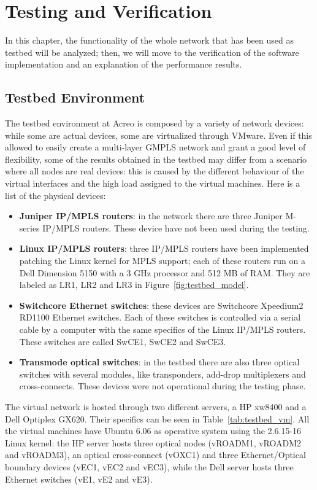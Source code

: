 \documentclass[10pt,a4paper]{report}
\begin{document}
\chapter{Testing and Verification}\label{sec:test}
 
In this chapter, the functionality of the whole network that has been
used as testbed will be analyzed; then, we will move to the
verification of the software implementation and an explanation of the
performance results.
 
\section{Testbed Environment}
 
The testbed environment at Acreo is composed by a variety of network
devices: while some are actual devices, some are virtualized through
VMware. Even if this allowed to easily create a multi-layer GMPLS
network and grant a good level of flexibility, some of the results
obtained in the testbed may differ from a scenario where all nodes are
real devices: this is caused by the different behaviour of the virtual
interfaces and the high load assigned to the virtual machines. Here is
a list of the physical devices:
\begin{itemize}
\item \textbf{Juniper IP/MPLS routers}: in the network there are three
  Juniper M-series IP/MPLS routers. These device have not been used
  during the testing.
\item \textbf{Linux IP/MPLS routers}: three IP/MPLS routers have been
  implemented patching the Linux kernel for MPLS support; each of
  these routers run on a Dell Dimension 5150 with a 3 GHz processor
  and 512 MB of RAM\@. They are labeled as LR1, LR2 and LR3 in
  Figure~\ref{fig:testbed_model}.
\item \textbf{Switchcore Ethernet switches}: these devices are
  Switchcore Xpeedium2 RD1100 Ethernet switches. Each of these
  switches is controlled via a serial cable by a computer with the
  same specifics of the Linux IP/MPLS routers. These switches are
  called SwCE1, SwCE2 and SwCE3.
\item \textbf{Transmode optical switches}: in the testbed there are
  also three optical switches with several modules, like transponders,
  add-drop multiplexers and cross-connects. These devices were not
  operational during the testing phase.
\end{itemize}
 
The virtual network is hosted through two different servers, a HP
xw8400 and a Dell Optiplex GX620. Their specifics can be seen in
Table~\ref{tab:testbed_vm}. All the virtual machines have Ubuntu 6.06
as operative system using the 2.6.15-16 Linux kernel: the HP server
hosts three optical nodes (vROADM1, vROADM2 and vROADM3), an optical
cross-connect (vOXC1) and three Ethernet/Optical boundary devices
(vEC1, vEC2 and vEC3), while the Dell server hosts three Ethernet
switches (vE1, vE2 and vE3).
 
\end{document}
